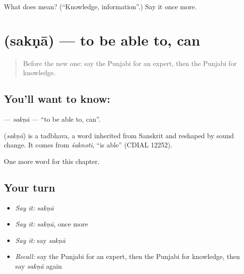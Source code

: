 \begin{tcolorbox}[breakable,colback=teal!4,colframe=teal!35!black,title={Before you move on}]
What does  mean? (\textquotedblleft{}Knowledge, information\textquotedblright{}.) Say it once more.
\end{tcolorbox}
\section[\texorpdfstring{\pa{ਸਕਣਾ} (sakṇā)}{ਸਕਣਾ (sakṇā)}]{ (sakṇā) — to be able to, can}

\label{lesson:PA-C109-sakna}



\begin{quote}
Before the new one: say the Punjabi for an expert, then the Punjabi for knowledge.
\end{quote}

\subsection*{You'll want to know: }
\textbf{} — \emph{sakṇā} — \textquotedblleft{}to be able to, can\textquotedblright{}.

\begin{cousinweb}
\textbf{} (\emph{sakṇā}) is a tadbhava, a word inherited from Sanskrit and reshaped by sound change. It comes from \emph{śaknoti}, \textquotedblleft{}is able\textquotedblright{} (CDIAL 12252).
\end{cousinweb}

\begin{grammarlens}[title={What you've built}]
One more word for this chapter.
\end{grammarlens}

\subsection*{Your turn}
\begin{itemize}
\raggedright
  \item \emph{Say it:} \emph{sakṇā}
  \item \emph{Say it:} \emph{sakṇā}, once more
  \item \emph{Say it:} say \emph{sakṇā}
  \item \emph{Recall:} say the Punjabi for an expert, then the Punjabi for knowledge, then say \emph{sakṇā} again
\end{itemize}

